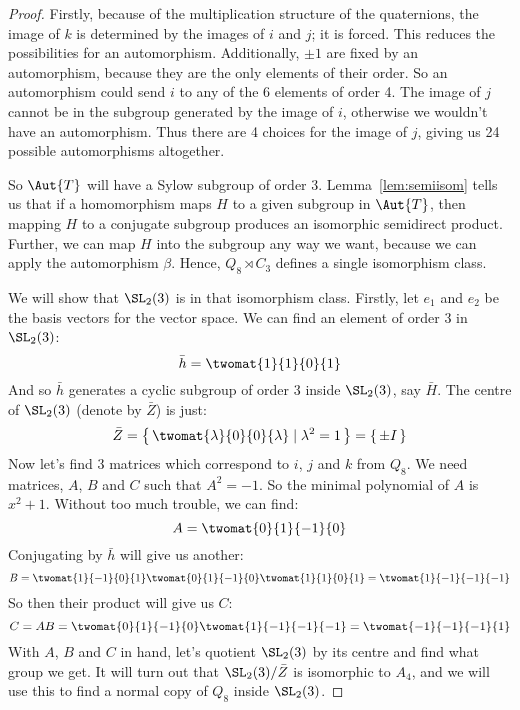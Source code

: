 \begin{proof}
    Firstly, because of the multiplication structure of the quaternions, the image of \(k\) is determined by the
    images of \(i\) and \(j\); it is forced.
    This reduces the possibilities for an automorphism.
    Additionally, \(\pm 1\) are fixed by an automorphism, because they are the only elements of their order.
    So an automorphism could send \(i\) to any of the 6 elements of order 4.
    The image of \(j\) cannot be in the subgroup generated by the image of \(i\), otherwise we wouldn't have an
    automorphism.
    Thus there are 4 choices for the image of \(j\), giving us 24 possible automorphisms altogether.

    So \(\Aut{T}\) will have a Sylow subgroup of order 3.
    Lemma~\ref{lem:semiisom} tells us that if a homomorphism maps \(H\) to a given subgroup in \(\Aut{T}\), then
    mapping \(H\) to a conjugate subgroup produces an isomorphic semidirect product.
    Further, we can map \(H\) into the subgroup any way we want, because we can apply the automorphism \(\beta\).
    Hence, \(Q_8 \rtimes C_3\) defines a single isomorphism class.

    We will show that \(\SL_2(3)\) is in that isomorphism class.
    Firstly, let \(e_1\) and \(e_2\) be the basis vectors for the vector space.
    We can find an element of order 3 in \(\SL_2(3)\):
    \[\bar{h} = \twomat{1}{1}{0}{1}\]
    And so \(\bar{h}\) generates a cyclic subgroup of order 3 inside \(\SL_2(3)\), say \(\bar{H}\).
    The centre of \(\SL_2(3)\) (denote by \(\bar{Z}\)) is just:
    \[ \bar{Z} = \left\{\,\twomat{\lambda}{0}{0}{\lambda} \mid \lambda^2 = 1\,\right\} = \{\,\pm I\,\} \]
    Now let's find 3 matrices which correspond to \(i\), \(j\) and \(k\) from \(Q_8\).
    We need matrices, \(A\), \(B\) and \(C\) such that \(A^2 = -1\).
    So the minimal polynomial of \(A\) is \(x^2 + 1\).
    Without too much trouble, we can find:
    \[ A = \twomat{0}{1}{-1}{0} \]
    Conjugating by \(\bar{h}\) will give us another:
    \[ B = \twomat{1}{-1}{0}{1}\twomat{0}{1}{-1}{0}\twomat{1}{1}{0}{1} = \twomat{1}{-1}{-1}{-1} \]
    So then their product will give us \(C\):
    \[ C = AB = \twomat{0}{1}{-1}{0}\twomat{1}{-1}{-1}{-1} = \twomat{-1}{-1}{-1}{1} \]
    With \(A\), \(B\) and \(C\) in hand, let's quotient \(\SL_2(3)\) by its centre and find what group we get.
    It will turn out that \(\SL_2(3)/\bar{Z}\) is isomorphic to \(A_4\), and we will use this to find a normal copy of
    \(Q_8\) inside \(\SL_2(3)\).


\end{proof}
